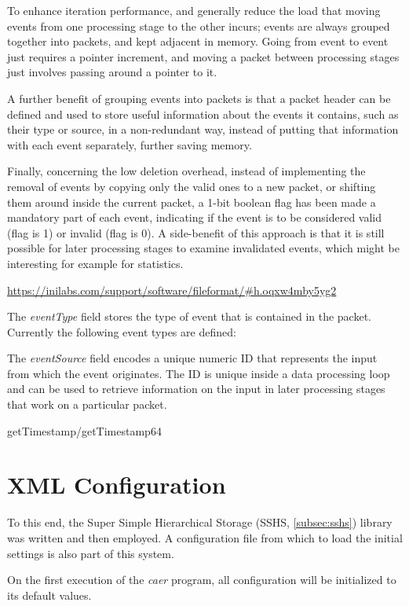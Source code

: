 \documentclass[a4paper,12pt]{report}
\begin{document}
To enhance iteration performance, and generally reduce the load that moving events from one processing stage to the other incurs; events are always grouped together into packets, and kept adjacent in memory. Going from event to event just requires a pointer increment, and moving a packet between processing stages just involves passing around a pointer to it.

A further benefit of grouping events into packets is that a packet header can be defined and used to store useful information about the events it contains, such as their type or source, in a non-redundant way, instead of putting that information with each event separately, further saving memory.

Finally, concerning the low deletion overhead, instead of implementing the removal of events by copying only the valid ones to a new packet, or shifting them around inside the current packet, a 1-bit boolean flag has been made a mandatory part of each event, indicating if the event is to be considered valid (flag is 1) or invalid (flag is 0). A side-benefit of this approach is that it is still possible for later processing stages to examine invalidated events, which might be interesting for example for statistics.

\url{https://inilabs.com/support/software/fileformat/#h.oqxw4mby5yg2}

The \emph{eventType} field stores the type of event that is contained in the packet.
Currently the following event types are defined:

The \emph{eventSource} field encodes a unique numeric ID that represents the input from which the event originates.
The ID is unique inside a data processing loop and can be used to retrieve information on the input in later processing stages that work on a particular packet.

getTimestamp/getTimestamp64

\section{XML Configuration} \label{sec:xml_configuration}

To this end, the Super Simple Hierarchical Storage (SSHS, \ref{subsec:sshs}) library was written and then employed. A configuration file from which to load the initial settings is also part of this system.

On the first execution of the \emph{caer} program, all configuration will be initialized to its default values.
\end{document}
